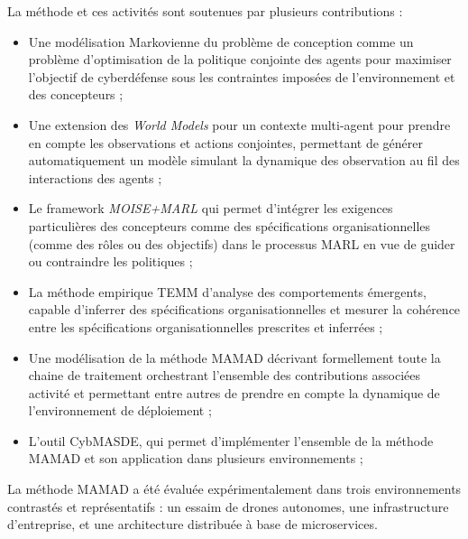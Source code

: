 \documentclass[ twoside,openright,titlepage,numbers=noenddot,headinclude,%
                footinclude=true,cleardoublepage=empty,abstractoff, %
                BCOR=5mm,paper=a4,fontsize=11pt,%
                french,american,%
                ]{scrreprt}
\begin{document}
La méthode et ces activités sont soutenues par plusieurs contributions :
\begin{itemize}
    \item Une modélisation Markovienne du problème de conception comme un problème d'optimisation de la politique conjointe des agents pour maximiser l'objectif de cyberdéfense sous les contraintes imposées de l'environnement et des concepteurs ;
    \item Une extension des \textit{World Models} pour un contexte multi-agent pour prendre en compte les observations et actions conjointes, permettant de générer automatiquement un modèle simulant la dynamique des observation au fil des interactions des agents ;
    \item Le framework \textit{MOISE+MARL} qui permet d'intégrer les exigences particulières des concepteurs comme des spécifications organisationnelles (comme des rôles ou des objectifs) dans le processus MARL en vue de guider ou contraindre les politiques ;
    \item La méthode empirique \ac{TEMM} d'analyse des comportements émergents, capable d'inferrer des spécifications organisationnelles et mesurer la cohérence entre les spécifications organisationnelles prescrites et inferrées ;
    \item Une modélisation de la méthode MAMAD décrivant formellement toute la chaine de traitement orchestrant l'ensemble des contributions associées activité et permettant entre autres de prendre en compte la dynamique de l'environnement de déploiement ;
    \item L'outil \ac{CybMASDE}, qui permet d'implémenter l'ensemble de la méthode MAMAD et son application dans plusieurs environnements ;
\end{itemize}

La méthode MAMAD a été évaluée expérimentalement dans trois environnements contrastés et représentatifs : un essaim de drones autonomes, une infrastructure d'entreprise, et une architecture distribuée à base de microservices.

\

\bigskip

\\
\end{document}
